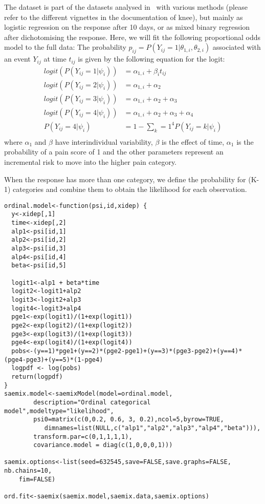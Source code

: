 The dataset is part of the datasets analysed in~\cite{Tutz12} with various methods (please refer to the different vignettes in the documentation of {\sf knee}), but mainly as logistic regression on the response after 10 days, or as mixed binary regression after dichotomising the response. Here, we will fit the following proportional odds model to the full data:
The probability $p_{ij}=P(Y_{ij}=1 | \theta_{1,i}, \theta_{2,i})$ associated with an event $Y_{ij}$ at time $t_{ij}$ is given by the following equation for the logit:
\begin{equation}
\begin{split}
logit(P(Y_{ij} = 1 | \psi_i)) &= \alpha_{1,i} + \beta_{i} t_{ij} \\
logit(P(Y_{ij} = 2 | \psi_i)) &= \alpha_{1,i} + \alpha_2 \\
logit(P(Y_{ij} = 3 | \psi_i)) &= \alpha_{1,i} + \alpha_2 + \alpha_3 \\
logit(P(Y_{ij} = 4 | \psi_i)) &= \alpha_{1,i} + \alpha_2 + \alpha_3 +\alpha_4\\
P(Y_{ij} = 4 | \psi_i) &= 1 - \sum_k=1^4 P(Y_{ij} = k | \psi_i)\\
\end{split}
\end{equation}
where $\alpha_1$ and $\beta$ have interindividual variability, $\beta$ is the effect of time, $\alpha_1$ is the probability of a pain score of 1 and the other parameters represent an incremental risk to move into the higher pain category.

When the response has more than one category, we define the probability for (K-1) categories and combine them to obtain the likelihood for each observation.

\begin{verbatim}
ordinal.model<-function(psi,id,xidep) {
  y<-xidep[,1]
  time<-xidep[,2]
  alp1<-psi[id,1]
  alp2<-psi[id,2]
  alp3<-psi[id,3]
  alp4<-psi[id,4]
  beta<-psi[id,5]
  
  logit1<-alp1 + beta*time
  logit2<-logit1+alp2
  logit3<-logit2+alp3
  logit4<-logit3+alp4
  pge1<-exp(logit1)/(1+exp(logit1))
  pge2<-exp(logit2)/(1+exp(logit2))
  pge3<-exp(logit3)/(1+exp(logit3))
  pge4<-exp(logit4)/(1+exp(logit4))
  pobs<-(y==1)*pge1+(y==2)*(pge2-pge1)+(y==3)*(pge3-pge2)+(y==4)*(pge4-pge3)+(y==5)*(1-pge4)
  logpdf <- log(pobs)  
  return(logpdf)
}  
saemix.model<-saemixModel(model=ordinal.model,
        description="Ordinal categorical model",modeltype="likelihood",
        psi0=matrix(c(0,0.2, 0.6, 3, 0.2),ncol=5,byrow=TRUE,
           dimnames=list(NULL,c("alp1","alp2","alp3","alp4","beta"))),
        transform.par=c(0,1,1,1,1),
        covariance.model = diag(c(1,0,0,0,1)))

saemix.options<-list(seed=632545,save=FALSE,save.graphs=FALSE, nb.chains=10, 
    fim=FALSE)

ord.fit<-saemix(saemix.model,saemix.data,saemix.options)
\end{verbatim}


